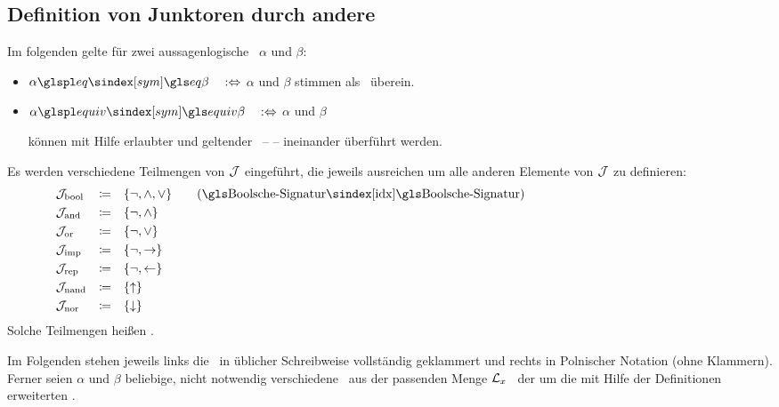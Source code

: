 \subsection{Definition von Junktoren durch andere}%
\label{sub:ausJunktorDef}

Im folgenden gelte für zwei aussagenlogische \Formeln\ $\alpha$ und $\beta$:
\begin{itemize}
	\item[] $\alpha \glsSym{eq}    \beta \quad \metadefeq$ \quad $\alpha$ und $\beta$
	stimmen als \Zeichenkette\ überein.
	\item[] $\alpha \glsSym{equiv} \beta \quad \metadefeq$ \quad $\alpha$ und $\beta$
	\parbox[t]{11cm}{können mit Hilfe erlaubter  und geltender \Axiome\ --  -- ineinander überführt werden.}
\end{itemize}

Es werden verschiedene Teilmengen von $\mathcal{J}$ eingeführt, die jeweils ausreichen um alle anderen Elemente von $\mathcal{J}$ zu definieren:
\begin{align}
	& \alJun_\iBool & \defeq & \quad\{ \lnot, \land, \lor \} \label{def:Jbool}
	\qquad (\text{\BoolscheSignatur})
	\\
	& \alJun_\iAnd  & \defeq & \quad\{ \lnot, \land       \} \label{def:Jand}
	\\
	& \alJun_\iOr   & \defeq & \quad\{ \lnot, \lor        \} \label{def:Jor}
	\\
	& \alJun_\iImp  & \defeq & \quad\{ \lnot, \limp       \} \label{def:Jimp}
	\\
	& \alJun_\iRep  & \defeq & \quad\{ \lnot, \lrep       \} \label{def:Jrep}
	\\
	& \alJun_\iNand & \defeq & \quad\{ \lnand             \} \label{def:Jnand}
	\\
	& \alJun_\iNor  & \defeq & \quad\{ \lnor              \} \label{def:Jnor}
	\formulatoleft\formulatoleft\formulatoleft
\end{align}
Solche Teilmengen heißen \logischeSignatur.

Im Folgenden stehen jeweils links die \Formeln\ in üblicher Schreibweise vollständig geklammert und rechts in Polnischer Notation (ohne Klammern).
Ferner seien $\alpha$ und $\beta$ beliebige, nicht notwendig verschiedene \Formeln\ aus der passenden Menge $\mathcal{L}_x$ \textbzgl\ der um die mit Hilfe der Definitionen erweiterten \Formelmenge.

